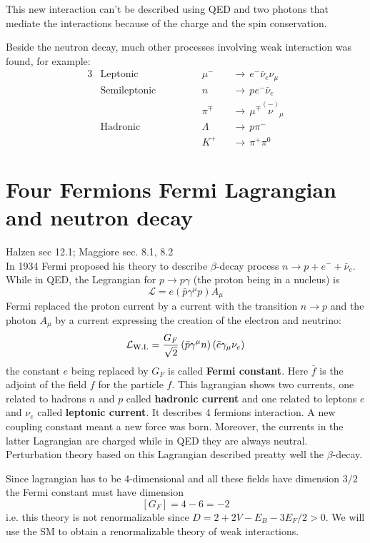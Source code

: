 \documentclass[TheoreticalPhy_ModB.tex]{subfiles}
\begin{document}
This new interaction can't be described using QED and two photons that mediate the interactions because of the charge and the spin conservation. 

Beside the neutron decay, much other processes involving weak interaction was found, for example:
\begin{alignat*}{3}
&\text{Leptonic}\hspace{2cm}
&&\mu^-&&\to\, e^-\bar\nu_e\nu_\mu\\
&\text{Semileptonic}
&&n&&\to\, pe^-\bar\nu_e\\
&&&\pi^\mp&&\to\,\mu^\mp\overset{(-)}{\nu}_\mu\\
&\text{Hadronic}
&&\Lambda&&\to\, p\pi^-\\
&&&K^+&&\to\,\pi^+\pi^0
\end{alignat*}

\section{Four Fermions Fermi Lagrangian and neutron decay}
\textsf{Halzen sec 12.1; Maggiore sec. 8.1, 8.2}\\

In 1934 Fermi proposed his theory to describe $\beta$-decay process $n\to p+e^-+\bar \nu_e$. While in QED, the Legrangian for $p\to p\gamma$ (the proton being in a nucleus) is
\[\mathcal L=e(\bar p\gamma^\mu p)A_\mu\]
Fermi replaced the proton current by a current with the transition $n\to p$ and the photon $A_\mu$ by a current expressing the creation of the electron and neutrino:
\[\mathcal L_{\text{W.I.}}=\frac{G_F}{\sqrt 2}\left(\bar p\gamma^\mu n\right)\left(\bar e \gamma_\mu\nu_e\right)\]
the constant $e$ being replaced by $G_F$ is called \textbf{Fermi constant}. Here $\bar f$ is the adjoint of the field $f$ for the particle $f$. This lagrangian shows two currents, one related to hadrons $n$ and $p$ called \textbf{hadronic current} and one related to leptons $e$ and $\nu_e$ called \textbf{leptonic current}. It describes 4 fermions interaction. A new coupling constant meant a new force was born. Moreover, the currents in the latter Lagrangian are charged while in QED they are always neutral. Perturbation theory based on this Lagrangian described preatty well the $\beta$-decay.

Since lagrangian has to be 4-dimensional and all these fields have dimension $3/2$ the Fermi constant must have dimension
\[[G_F]=4-6=-2\]
i.e. this theory is not renormalizable since $D=2+2V-E_B-3E_F/2>0$. We will use the SM to obtain a renormalizable theory of weak interactions. 
\end{document}
